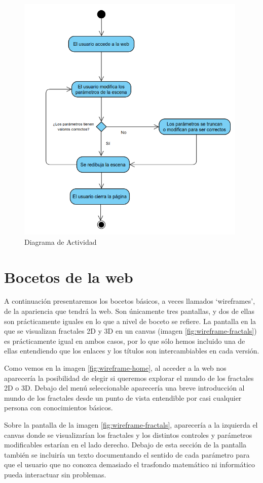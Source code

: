 \newpage
\begin{figure} [ht]
    \centering
    \includegraphics[width=11cm]{img/diagrama-actividad.png}
    \caption{Diagrama de Actividad}
        \label{fig:diagrama-actividad}
    \end{figure}


\section{Bocetos de la web}


A continuación presentaremos los bocetos básicos, a veces llamados `wireframes', de la apariencia que tendrá la web. Son únicamente tres pantallas, y dos de ellas son prácticamente iguales en lo que a nivel de boceto se refiere. La pantalla en la que se visualizan fractales 2D y 3D en un canvas (imagen \ref{fig:wireframe-fractals}) es prácticamente igual en ambos casos, por lo que sólo hemos incluido una de ellas entendiendo que los enlaces y los títulos son intercambiables en cada versión. 


Como vemos en la imagen \ref{fig:wireframe-home}, al acceder a la web nos aparecería la posibilidad de elegir si queremos explorar el mundo de los fractales 2D o 3D. Debajo del menú seleccionable aparecería una breve introducción al mundo de los fractales desde un punto de vista entendible por casi cualquier persona con conocimientos básicos.

Sobre la pantalla de la imagen \ref{fig:wireframe-fractals}, aparecería a la izquierda el canvas donde se visualizarían los fractales y los distintos controles y parámetros modificables estarían en el lado derecho. Debajo de esta sección de la pantalla también se incluiría un texto documentando el sentido de cada parámetro para que el usuario que no conozca demasiado el trasfondo matemático ni informático pueda interactuar sin problemas.

